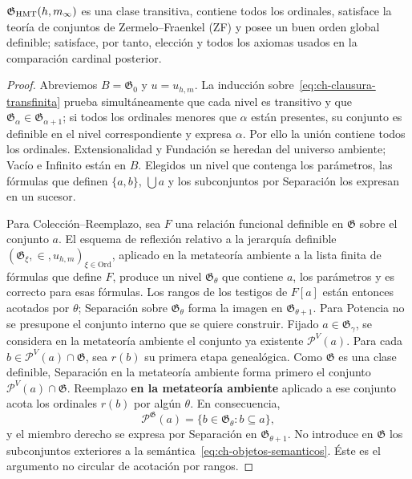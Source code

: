 \begin{lemma}
\label{thm:ch-6b}
\(\mathfrak G_{\rm HMT}(h,m_\infty)\) es una clase transitiva, contiene todos
los ordinales, satisface la teoría de conjuntos de Zermelo--Fraenkel (ZF) y
posee un buen orden global definible; satisface,
por tanto, elección y todos los axiomas usados en la comparación cardinal posterior.

\end{lemma}
\begin{proof}
Abreviemos \(B=\mathfrak G_0\) y \(u=u_{h,m}\). La inducción
sobre~\eqref{eq:ch-clausura-transfinita} prueba simultáneamente que cada nivel es transitivo y que
\(\mathfrak G_\alpha\in\mathfrak G_{\alpha+1}\); si todos los ordinales
menores que \(\alpha\) están presentes, su conjunto es definible en el nivel
correspondiente y expresa \(\alpha\). Por ello la unión contiene todos los
ordinales. Extensionalidad y Fundación se heredan del universo ambiente;
Vacío e Infinito están en \(B\). Elegidos un nivel que contenga los parámetros,
las fórmulas que definen \(\{a,b\}\), \(\bigcup a\) y los subconjuntos por
Separación los expresan en un sucesor.

Para Colección--Reemplazo, sea \(F\) una relación funcional definible en
\(\mathfrak G\) sobre el conjunto \(a\). El esquema de reflexión relativo a
la jerarquía definible \((\mathfrak G_\xi,\in,u_{h,m})_{\xi\in\mathrm{Ord}}\),
aplicado en la metateoría ambiente a la lista finita de fórmulas que define
\(F\), produce un nivel
\(\mathfrak G_\theta\) que contiene \(a\), los parámetros y es correcto para
esas fórmulas. Los rangos de los testigos de \(F[a]\) están entonces acotados
por \(\theta\); Separación sobre \(\mathfrak G_\theta\) forma la imagen en
\(\mathfrak G_{\theta+1}\). Para Potencia no se presupone el conjunto interno
que se quiere construir. Fijado \(a\in\mathfrak G_\gamma\), se considera en
la metateoría ambiente el conjunto ya existente \(\mathcal P^V(a)\). Para
cada \(b\in\mathcal P^V(a)\cap\mathfrak G\), sea \(r(b)\) su primera etapa
genealógica. Como \(\mathfrak G\) es una clase definible, Separación en la
metateoría ambiente forma primero el conjunto
\(\mathcal P^V(a)\cap\mathfrak G\). Reemplazo \textbf{en la metateoría ambiente}
aplicado a ese conjunto acota los ordinales \(r(b)\) por algún \(\theta\).
En consecuencia,
\[
 \mathcal P^{\mathfrak G}(a)
 =\{b\in\mathfrak G_\theta:b\subseteq a\},
\]
y el miembro derecho se expresa por Separación en
\(\mathfrak G_{\theta+1}\). No introduce en \(\mathfrak G\) los subconjuntos
exteriores a la semántica~\eqref{eq:ch-objetos-semanticos}. Éste es el argumento no circular de
acotación por rangos.


\end{proof}
